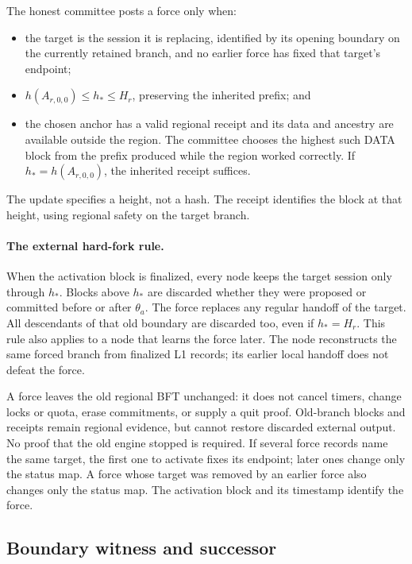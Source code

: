 \documentclass[11pt,a4paper]{article}
\begin{document}
The honest committee posts a force only when:
\begin{itemize}
\item the target is the session it is replacing, identified by its
opening boundary on the currently retained branch, and no earlier
force has fixed that target's endpoint;
\item $h(A_{r,0,0})\le h_*\le H_r$, preserving the inherited prefix; and
\item the chosen anchor has a valid regional receipt and its data and
ancestry are available outside the region. The committee chooses the
highest such DATA block from the prefix produced while the region
worked correctly. If $h_*=h(A_{r,0,0})$, the inherited receipt suffices.
\end{itemize}
The update specifies a height, not a hash. The receipt identifies the
block at that height, using regional safety on the target branch.

\paragraph{The external hard-fork rule.}
When the activation block is finalized, every node keeps the target
session only through $h_*$. Blocks above $h_*$ are discarded whether
they were proposed or committed before or after $\theta_a$. The force
replaces any regular handoff of the target. All descendants of that old
boundary are discarded too, even if $h_*=H_r$. This rule also applies
to a node that learns the force later.
The node reconstructs the same forced branch from finalized L1 records;
its earlier local handoff does not defeat the force.

A force leaves the old regional BFT unchanged: it does not cancel timers,
change locks or quota, erase commitments, or supply a quit proof.
Old-branch blocks and receipts remain regional evidence, but cannot
restore discarded external output. No proof that the old engine stopped
is required. If several force records name the same target, the first
one to activate fixes its endpoint; later ones change only the status
map. A force whose target was removed by an earlier force also changes
only the status map. The activation block and its timestamp identify
the force.

\subsection{Boundary witness and successor}
\label{sec:witness}
\end{document}

